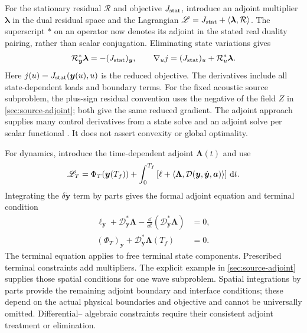 For the stationary residual $\mathcal R$ and objective $J_{\rm stat}$, introduce
an adjoint multiplier $\bm\lambda$ in the dual residual space and the Lagrangian
$\mathscr L=J_{\rm stat}+\left\langle\bm\lambda,\mathcal R\right\rangle$. The superscript
$\ast$ on an operator now denotes its adjoint in the stated real duality
pairing, rather than scalar conjugation. Eliminating state variations gives
\begin{equation}
 \mathcal R_{\bm y}^{\ast}\bm\lambda
        =-(J_{\rm stat})_{\bm y},\qquad
 \nabla_{u}j=(J_{\rm stat})_{u}
                       +\mathcal R_u^{\ast}\bm\lambda.
 \label{eq:stationary-adjoint}
\end{equation}
Here $j(u)=J_{\rm stat}(\bm y(u),u)$ is the reduced objective.
The derivatives include all state-dependent loads and boundary terms.
For the fixed acoustic source subproblem, the plus-sign residual convention
uses the negative of the field $Z$ in \cref{sec:source-adjoint}; both give
the same reduced gradient. The adjoint approach supplies many control derivatives from a state solve and
an adjoint solve per scalar functional \cite{giles2000}. It does not assert
convexity or global optimality.

For dynamics, introduce the time-dependent adjoint $\bm\Lambda(t)$ and use
\begin{equation}
 \mathscr L_T=\Phi_T(\bm y(T_f))+
   \int_0^{T_f}\left[\ell+
        \left\langle\bm\Lambda,\mathcal D(\bm y,\dot{\bm y},\bm a)\right\rangle\right]\,\mathrm d t.
 \label{eq:dynamic-lagrangian}
\end{equation}
Integrating the $\delta\dot{\bm y}$ term by parts gives the formal adjoint
equation and terminal condition
\begin{align}
 \ell_{\bm y}+\mathcal D_{\bm y}^{\ast}\bm\Lambda
       -\frac{\dd}{\dd t}
            (\mathcal D_{\dot{\bm y}}^{\ast}\bm\Lambda)&=0,
 \label{eq:dynamic-adjoint}\\
 (\Phi_T)_{\bm y}
       +\mathcal D_{\dot{\bm y}}^{\ast}\bm\Lambda(T_f)&=0.
 \label{eq:adjoint-terminal}
\end{align}
The terminal equation applies to free terminal state components. Prescribed
terminal constraints add multipliers. The explicit example in \cref{sec:source-adjoint} supplies those spatial
conditions for one wave subproblem. Spatial integrations by parts provide
the remaining adjoint boundary and interface conditions; these depend on the actual physical
boundaries and objective and cannot be universally omitted. Differential--
algebraic constraints require their consistent adjoint treatment or elimination.

